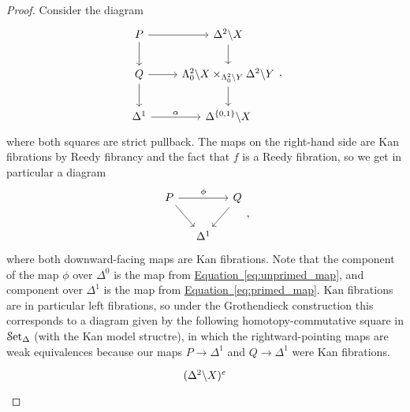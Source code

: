 \documentclass[main.tex]{subfiles}
\begin{document}
\begin{proof}
  Consider the diagram
  \begin{equation*}
    \begin{tikzcd}
      P
      \arrow[r]
      \arrow[d]
      & \Delta^{2} \backslash X
      \arrow[d]
      \\
      Q
      \arrow[r]
      \arrow[d]
      & \Lambda^{2}_{0} \backslash X \times_{\Lambda^{2}_{0} \backslash Y} \Delta^{2} \backslash Y
      \arrow[d]
      \\
      \Delta^{1}
      \arrow[r, "\alpha"]
      & \Delta^{\{0, 1\}} \backslash X
    \end{tikzcd},
  \end{equation*}
  where both squares are strict pullback. The maps on the right-hand side are Kan fibrations by Reedy fibrancy and the fact that $f$ is a Reedy fibration, so we get in particular a diagram
  \begin{equation*}
    \begin{tikzcd}[column sep=small]
      P
      \arrow[rr, "\phi"]
      \arrow[dr]
      && Q
      \arrow[dl]
      \\
      & \Delta^{1}
    \end{tikzcd},
  \end{equation*}
  where both downward-facing maps are Kan fibrations. Note that the component of the map $\phi$  over $\Delta^{0}$ is the map from \hyperref[eq:unprimed_map]{Equation~\ref*{eq:unprimed_map}}, and component over $\Delta^{1}$ is the map from \hyperref[eq:primed_map]{Equation~\ref*{eq:primed_map}}. Kan fibrations are in particular left fibrations, so under the Grothendieck construction this corresponds to a diagram
  given by the following homotopy-commutative square in $\mathcal{S}\mathrm{et}_{\Delta}$ (with the Kan model structre), in which the rightward-pointing maps are weak equivalences because our maps $P \to \Delta^{1}$ and $Q \to \Delta^{1}$ were Kan fibrations.
  \begin{equation*}
    \begin{tikzcd}
      (\Delta^{2} \backslash X)^{e}

\end{tikzcd}
\end{equation*}
\end{proof}
\end{document}
